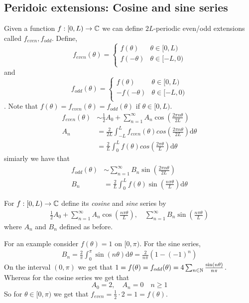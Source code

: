 \documentclass{article}
\begin{document}
\subsection{Peridoic extensions: Cosine and sine series}
Given a function $ f:[0,L)\to \mathbb{C} $ we can define $ 2L $-periodic even/odd extensions called $ f_{even},f_{odd} $. Define,
\[
	f_{even}(\theta)=\begin{cases}
		f(\theta) & \theta\in[0,L)\\
		f(-\theta) & \theta\in[-L,0)\\
	\end{cases}
\]
and\[ 
f_{odd}(\theta)=\begin{cases}
		f(\theta) & \theta\in[0,L)\\
		-f(-\theta) & \theta\in[-L,0)\\
	\end{cases}
\].
Note that $ f(\theta)=f_{even}(\theta)=f_{odd}(\theta) $ if $ \theta\in [0,L) $.
\begin{align*}
	f_{even}(\theta)&\sim \frac 12 A_0+\sum_{n=1}^\infty A_n\cos\left(\frac{2\pi n \theta}{2L}\right)
	\\
	A_n&=\frac2{2L}\int_{-L}^Lf_{even}(\theta)cos\left(\frac{2\pi n\theta}{2L}\right)\mathrm d\theta\\
	   &= \frac 2L\int_0^Lf(\theta)cos\left(\frac{2\pi\theta}L\right)\mathrm d\theta
\end{align*}
simiarly we have that 
\begin{align*}
	f_{odd}(\theta)&\sim\sum_{n=1}^\infty B_n\sin\left(\frac{2\pi n\theta}{2L}\right)\\
	B_n&=\frac 2L\int_0^Lf(\theta)\sin\left(\frac{n\pi\theta}L\right)\mathrm d\theta
\end{align*}
\begin{definition}
	For $ f: [0,L)\to \mathbb{C} $ define its \textit{cosine} and \textit{sine} series by
	\begin{align*}
		\frac{1}2 A_0+\sum_{n=1}^\infty A_n\cos\left(\frac{n\pi\theta}L\right),\quad \sum_{n=1}^\infty B_n\sin\left(\frac{n\pi\theta}L\right)
	\end{align*}
	where $ A_n $ and $ B_n $ defined as before.
\end{definition}
For an example consider $ f(\theta)=1 $ on $ [0,\pi) $. For the sine series,
\begin{align*}
	B_n=\frac 2\pi \int_0^\pi \sin(n\theta)\mathrm d\theta=\frac2{n\pi}(1-(-1)^n)
\end{align*}
On the interval $ (0,\pi) $ we get that $ 1=f(\theta)=f_{odd}(\theta)=4\sum_{n\in \mathbb{N}}\frac{\sin(n\theta)}{n\pi} $. Whereas for the cosine series we get that 
\[
A_0=2,\quad A_n=0\quad n\ge 1
\]
So for $ \theta\in[0,\pi) $ we get that $ f_{even}=\frac 12\cdot 2 =1 =f(\theta) $.
\end{document}
